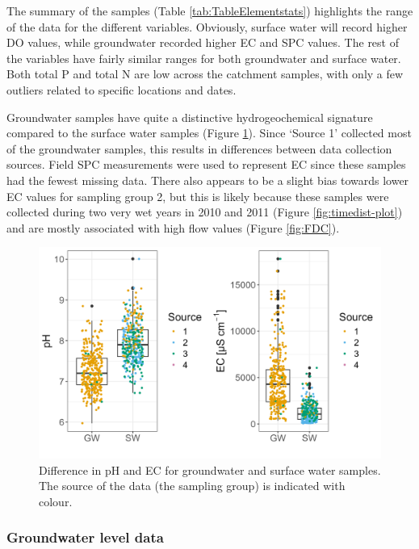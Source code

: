 \documentclass[, manuscript]{copernicus}
\begin{document}
The summary of the samples (Table \ref{tab:TableElementstats})
highlights the range of the data for the different variables. Obviously,
surface water will record higher DO values, while groundwater recorded
higher EC and SPC values. The rest of the variables have fairly similar
ranges for both groundwater and surface water. Both total P and total N
are low across the catchment samples, with only a few outliers related
to specific locations and dates.

Groundwater samples have quite a distinctive hydrogeochemical signature
compared to the surface water samples (Figure \ref{fig:gw_sw-plot}).
Since `Source 1' collected most of the groundwater samples, this results
in differences between data collection sources. Field SPC measurements
were used to represent EC since these samples had the fewest missing
data. There also appears to be a slight bias towards lower EC values for
sampling group 2, but this is likely because these samples were
collected during two very wet years in 2010 and 2011 (Figure
\ref{fig:timedist-plot}) and are mostly associated with high flow values
(Figure \ref{fig:FDC}).

\begin{figure}
\includegraphics[width=0.8\linewidth]{Figures/gwsw} \caption{Difference in pH and EC for groundwater and surface water samples. The source of the data (the sampling group) is indicated with colour.}\label{fig:gw_sw-plot}
\end{figure}

\subsubsection{Groundwater level data}
\end{document}
